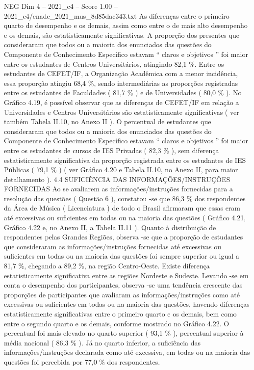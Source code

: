 \begin{textsample}{NEG Dim 4 – 2021\_c4 – Score 1.00 – 2021\_c4/enade\_2021\_mus\_8d85dac343.txt}
As diferenças entre o primeiro quarto de desempenho e os demais, assim como entre o de mais alto desempenho e os demais, são estatisticamente significativas.
A proporção dos presentes que consideraram que todos ou a maioria dos enunciados das questões do Componente de Conhecimento Específico estavam “ claros e objetivos ” foi maior entre os estudantes de Centros Universitários, atingindo 82,1 \%.
Entre os estudantes de CEFET/IF, a Organização Acadêmica com a menor incidência, essa proporção atingiu 68,4 \%, sendo intermediárias as proporções registradas entre os estudantes de Faculdades ( 81,7 \% ) e de Universidades ( 80,0 \% ).
No Gráfico 4.19, é possível observar que as diferenças de CEFET/IF em relação a Universidades e Centros Universitários são estatisticamente significativas ( ver também Tabela II.10, no Anexo II ).
O percentual de estudantes que consideraram que todos ou a maioria dos enunciados das questões do Componente de Conhecimento Específico estavam “ claros e objetivos ” foi maior entre os estudantes de cursos de IES Privadas ( 82,3 \% ), sem diferença estatisticamente significativa da proporção registrada entre os estudantes de IES Públicas ( 79,1 \% ) ( ver Gráfico 4.20 e Tabela II.10, no Anexo II, para maior detalhamento ). 4.4 SUFICIÊNCIA DAS INFORMAÇÕES/INSTRUÇÕES FORNECIDAS Ao se avaliarem as informações/instruções fornecidas para a resolução das questões ( Questão 6 ), constatou -se que 86,3 \% dos respondentes da Área de Música ( Licenciatura ) de todo o Brasil afirmaram que essas eram até excessivas ou suficientes em todas ou na maioria das questões ( Gráfico 4.21, Gráfico 4.22 e, no Anexo II, a Tabela II.11 ).
Quanto à distribuição de respondentes pelas Grandes Regiões, observa -se que a proporção de estudantes que consideraram as informações/instruções fornecidas até excessivas ou suficientes em todas ou na maioria das questões foi sempre superior ou igual a 81,7 \%, chegando a 89,2 \%, na região Centro-Oeste.
Existe diferença estatisticamente significativa entre as regiões Nordeste e Sudeste.
Levando -se em conta o desempenho dos participantes, observa -se uma tendência crescente das proporções de participantes que avaliaram as informações/instruções como até excessivas ou suficientes em todas ou na maioria das questões, havendo diferenças estatisticamente significativas entre o primeiro quarto e os demais, bem como entre o segundo quarto e os demais, conforme mostrado no Gráfico 4.22.
O percentual foi mais elevado no quarto superior ( 93,1 \% ), percentual superior à média nacional ( 86,3 \% ).
Já no quarto inferior, a suficiência das informações/instruções declarada como até excessiva, em todas ou na maioria das questões foi percebida por 77,0 \% dos respondentes.

\end{textsample}
